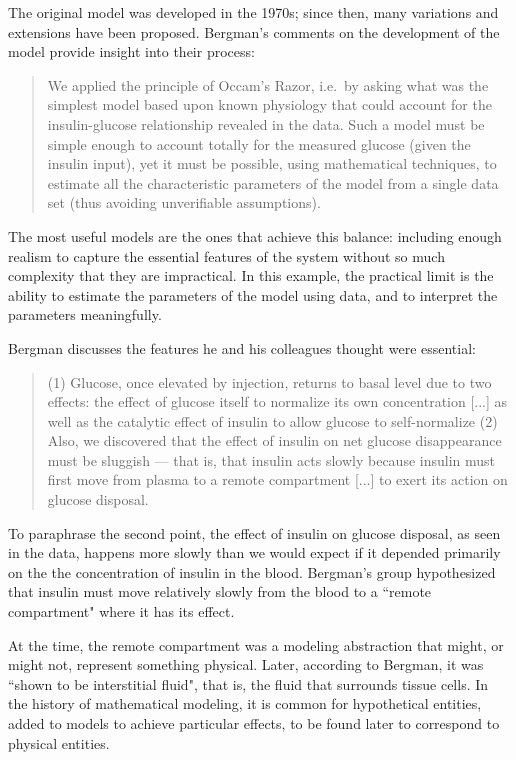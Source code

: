\documentclass[12pt]{book}
\theoremstyle{exercise}
\begin{document}

The original model was developed in the 1970s; since then, many variations and extensions have been proposed.  Bergman's comments on the development of the model provide insight into their process:

\begin{quote}
We applied the principle of Occam's Razor, i.e.~by asking
what was the simplest model based upon known physiology
that could account for the insulin-glucose relationship
revealed in the data. Such a model must be simple
enough to account totally for the measured glucose (given
the insulin input), yet it must be possible, using mathematical
techniques, to estimate all the characteristic parameters
of the model from a single data set (thus avoiding
unverifiable assumptions).
\end{quote}

The most useful models are the ones that achieve this balance: including enough realism to capture the essential features of the system without so much complexity that they are impractical.  In this example, the practical limit is the ability to estimate the parameters of the model using data, and to interpret the parameters meaningfully.


Bergman discusses the features he and his colleagues thought were essential:

\begin{quote}
(1) Glucose, once elevated by injection, returns to basal level due to
two effects: the effect of glucose itself to normalize its own
concentration [...] as well as the catalytic effect of insulin to allow
glucose to self-normalize (2) Also, we discovered
that the effect of insulin on net glucose disappearance
must be sluggish --- that is, that insulin acts slowly because
insulin must first move from plasma to a remote compartment [...] to exert its action on glucose disposal.
\end{quote}

To paraphrase the second point, the effect of insulin on glucose disposal, as seen in the data, happens more slowly than we would expect if it depended primarily on the the concentration of insulin in the blood.  Bergman's group hypothesized that insulin must move relatively slowly from the blood to a ``remote compartment" where it has its effect.


At the time, the remote compartment was a modeling abstraction that might, or might not, represent something physical.  Later, according to Bergman, it was ``shown to be interstitial fluid", that is, the fluid that surrounds tissue cells.  In the history of mathematical modeling, it is common for hypothetical entities, added to models to achieve particular effects, to be found later to correspond to physical entities.
\end{document}
